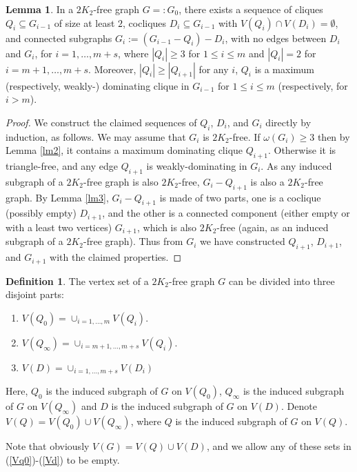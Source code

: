 \documentclass{amsart}
\theoremstyle{definition}
\newtheorem{lemma}{Lemma}
\newtheorem{definition}{Definition}
\begin{document}
\begin{lemma}\label{lm5}
In a $2K_2$-free graph $G=:G_0$, there exists a sequence of cliques
$Q_i\subseteq G_{i-1}$ of size at least $2$, cocliques $D_i\subseteq G_{i-1}$
with $V(Q_i)\cap V(D_i)=\emptyset$,  
and connected subgraphs $G_{i}:=(G_{i-1}-Q_{i})-D_{i}$, with
no edges between $D_i$ and $G_i$,  for
$i=1,\ldots,m+s$, where
$|Q_i|\ge3$ for $1\le i\le m$ and $|Q_i|=2$ for $i=m+1,\ldots,m+s$.
Moreover, $|Q_i|\ge|Q_{i+1}|$ for any $i$, $Q_i$ is a maximum
(respectively, weakly-) dominating
clique in $G_{i-1}$ for $1\leq i\leq m$ (respectively, for $i>m$).
\end{lemma}
\begin{proof}
We construct the claimed sequences of $Q_i$, $D_i$, 
and $G_i$ directly by induction, as follows. 
We may assume that $G_i$ is $2K_2$-free.
If $\omega(G_i)\ge3$ then by Lemma \ref{lm2}, it contains a 
maximum dominating clique $Q_{i+1}$.
Otherwise it is triangle-free, and any edge $Q_{i+1}$ is weakly-dominating
in $G_i$.
As any induced subgraph of a $2K_2$-free
graph is also $2K_2$-free, $G_i-Q_{i+1}$ is also a $2K_2$-free graph.
By Lemma \ref{lm3}, $G_i-Q_{i+1}$ is made of two parts, one is a coclique
(possibly empty) $D_{i+1}$, and the other is a connected
component (either empty or with a least two vertices) $G_{i+1}$, which is also
$2K_2$-free (again, as an induced subgraph of a $2K_2$-free graph).
Thus from $G_i$ we have constructed $Q_{i+1}$, $D_{i+1}$, and $G_{i+1}$
with the  claimed properties.
\end{proof}


\begin{definition}\label{lm6}
The vertex set of a $2K_2$-free graph $G$ can be divided into three disjoint parts:
\begin{enumerate}
\item $V(Q_0)=\cup_{i=1,\ldots,m}V(Q_i).$\label{Vq0}
\item $V(Q_{\infty})=\cup_{i=m+1,\ldots,m+s}V(Q_i).$\label{Vqinfty}
\item $V(D)=\cup_{i=1,\ldots,m+s}V(D_i)$\label{Vd}
\end{enumerate}
Here, $Q_0$ is the induced subgraph of $G$ on $V(Q_0)$, $Q_{\infty}$ is the induced subgraph of $G$ on $V(Q_{\infty})$ and $D$ is the induced subgraph of $G$ on $V(D)$. 
Denote $V(Q)=V(Q_0)\cup V(Q_{\infty})$, where $Q$ is the induced subgraph of $G$ on $V(Q)$. 
\end{definition}
Note that obviously $V(G)=V(Q)\cup V(D)$, and we allow any of these sets 
in (\ref{Vq0})-(\ref{Vd}) to be empty.
\end{document}
